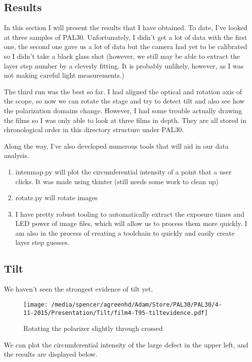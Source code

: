 \documentclass[reprint]{revtex4-1}
\begin{document}
\subsection*{Results}
In this section I will present the results that I have obtained. To date, I've
looked at three samples of PAL30. Unfortunately, I didn't get a lot of data with
the first one, the second one gave us a lot of data but the camera had yet to be
calibrated so I didn't take a black glass shot (however, we still may be able to
extract the layer step number by a cleverly fitting. It is probably unlikely,
however, as I was not making careful light measurements.)

The third run was the best so far. I had aligned the optical and rotation axis
of the scope, so now we can rotate the stage and try to detect tilt and also see
how the polarization domains change. However, I had some trouble actually
drawing the films so I was only able to look at three films in depth. They are
all stored in chronological order in this directory structure under PAL30.

Along the way, I've also developed numerous tools that will aid in our data
analysis. 
\begin{enumerate}
\item intenmap.py will plot the circumferential intensity of a point that a user
    clicks. It was made using tkinter (still needs some work to clean up)
\item rotate.py will rotate images
\item I have pretty robust tooling to automatically extract the exposure times
    and LED power of image files, which will allow us to process them more
    quickly. I am also in the process of creating a toolchain to quickly and
    easily create layer step guesses.
\end{enumerate}
\subsection*{Tilt}
We haven't seen the strongest evidence of tilt yet. 

\begin{figure}[H]
    \texttt{[image: /media/spencer/agreenhd/Adam/Store/PAL30/PAL30/4-11-2015/Presentation/Tilt/film4-T95-tiltevidence.pdf]}
    \caption{Rotating the polarizer slightly through crossed\label{pic:tilt}}
\end{figure}
We can plot the circumferential intensity of the large defect in the upper left,
and the results are displayed below.
\end{document}
